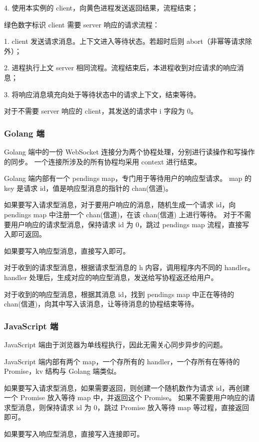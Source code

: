 \quad{}4. 使用本实例的 client，向黄色进程发送返回结果，流程结束；

绿色数字标识 client 需要 server 响应的请求流程：

\quad{}1. client 发送请求消息。上下文进入等待状态。若超时后则 abort（非幂等请求除外）；

\quad{}2. 进程执行上文 server 相同流程。流程结束后，本进程收到对应请求的响应消息；

\quad{}3. 将响应消息填充向处于等待状态中的请求上下文，结束等待。

对于不需要 server 响应的 client，其发送的请求中 i 字段为 0。

\subsubsection{Golang 端}
Golang 端中的一份 WebSocket 连接分为两个协程处理，分别进行读操作和写操作的同步。
一个连接所涉及的所有协程均采用 context 进行结束。

Golang 端内部有一个 pendings map，专门用于等待用户的响应型请求。
map 的 key 是请求 id，值是响应型消息的指针的 chan(信道)。

如果要写入请求型消息，对于要用户响应的消息，随机生成一个请求 id，向 pendings map 中注册一个 chan(信道)，在该 chan(信道) 上进行等待。
对于不需要用户响应的请求型消息，保持请求 id 为 0，跳过 pendings map 流程，直接写入即可返回。

如果要写入响应型消息，直接写入即可。

对于收到的请求型消息，根据请求型消息的 h 内容，调用程序内不同的 handler。handler 处理后，生成对应的响应型消息，发送给写协程返还给用户。

对于收到的响应型消息，根据其消息 id，找到 pendings map 中正在等待的 chan(信道)，向其中写入该消息，让等待消息的协程结束等待。

\subsubsection{JavaScript 端}
JavaScript 端由于浏览器为单线程执行，因此无需关心同步异步的问题。

JavaScript 端内部有两个 map，一个存所有的 handler，一个存所有在等待的 Promise，kv 结构与 Golang 端类似。

如果要写入请求型消息，如果需要返回，则创建一个随机数作为请求 id，再创建一个 Promise 放入等待 map 中，并返回这个 Promise。
如果不需要用户响应的请求型消息，则保持请求 id 为 0，跳过 Promise 放入等待 map 等过程，直接返回即可。

如果要写入响应型消息，直接写入连接即可。


